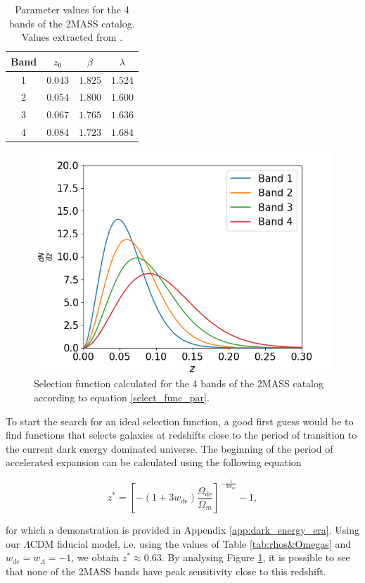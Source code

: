 \documentclass[openany,a4paper,12pt,oneside]{book}
\begin{document}
\begin{spacing}{1.5}
\begin{table}[!htb]
\centering
    \begin{tabular}{cccc} \hline
     Band & $z_0$ & $\beta$ & $\lambda$ \\ \hline
     1 & $0.043$ & $1.825$ & $1.524$\\
     2 & $0.054$ & $1.800$ & $1.600$ \\
     3 & $0.067$ & $1.765$ & $1.636$\\
     4 & $0.084$ & $1.723$ & $1.684$\\ \hline
    \end{tabular}
    \caption{Parameter values for the 4 bands of the 2MASS catalog. Values extracted from \cite{cross_corr:Afshordi}.}
    \label{tab:bands_2MASS}
\end{table}

\begin{figure}[!htb]
	\centering
	\includegraphics[width=.7\linewidth]{Imagens/selection_2MASS.png}
	\caption{Selection function calculated for the 4 bands of the 2MASS catalog according to equation \eqref{select_func_par}.}
	\label{fig:2MASS_selections}
\end{figure}

To start the search for an ideal selection function, a good first guess would be to find functions that selects galaxies at redshifts close to the period of transition to the current dark energy dominated universe. The beginning of the period of accelerated expansion can be calculated using the following equation \cite{dark_energy_era}

\begin{equation}\label{dark_energy_era_redshift}
	z^*=\left[-(1+3w_\text{de})\frac{\Omega_\text{de}}{\Omega_m}\right]^{-\frac{1}{3w_\text{de}}}-1,
\end{equation}

\noindent for which a demonstration is provided in Appendix \ref{app:dark_energy_era}. Using our $\Lambda$CDM fiducial model, i.e. using the values of Table \ref{tab:rhos&Omegas} and $w_{de}=w_\Lambda=-1$, we obtain $z^*\approx 0.63$. By analysing Figure \ref{fig:2MASS_selections}, it is possible to see that none of the 2MASS bands have peak sensitivity close to this redshift.


\end{spacing}
\end{document}
